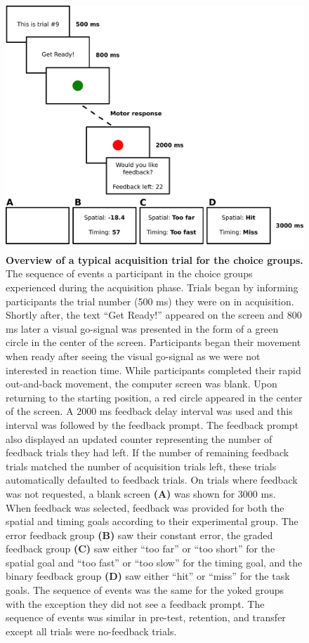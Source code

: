 \documentclass[
  man, donotrepeattitle,floatsintext]{apa7}
\begin{document}
\begin{figure}

{\centering \includegraphics[height=0.45\textheight]{../../figs/fig1} 

}

\caption{\small \onehalfspacing \textbf{Overview of a typical acquisition trial for the choice groups.} The sequence of events a participant in the choice groups experienced during the acquisition phase. Trials began by informing participants the trial number (500 ms) they were on in acquisition. Shortly after, the text ``Get Ready!'' appeared on the screen and 800 ms later a visual go-signal was presented in the form of a green circle in the center of the screen. Participants began their movement when ready after seeing the visual go-signal as we were not interested in reaction time. While participants completed their rapid out-and-back movement, the computer screen was blank. Upon returning to the starting position, a red circle appeared in the center of the screen. A 2000 ms feedback delay interval was used and this interval was followed by the feedback prompt. The feedback prompt also displayed an updated counter representing the number of feedback trials they had left. If the number of remaining feedback trials matched the number of acquisition trials left, these trials automatically defaulted to feedback trials. On trials where feedback was not requested, a blank screen \textbf{(A)} was shown for 3000 ms. When feedback was selected, feedback was provided for both the spatial and timing goals according to their experimental group. The error feedback group \textbf{(B)} saw their constant error, the graded feedback group \textbf{(C)} saw either ``too far'' or ``too short'' for the spatial goal and ``too fast'' or ``too slow'' for the timing goal, and the binary feedback group \textbf{(D)} saw either ``hit'' or ``miss'' for the task goals. The sequence of events was the same for the yoked groups with the exception they did not see a feedback prompt. The sequence of events was similar in pre-test, retention, and transfer except all trials were no-feedback trials.}\label{fig:fig1}
\end{figure}
\end{document}

